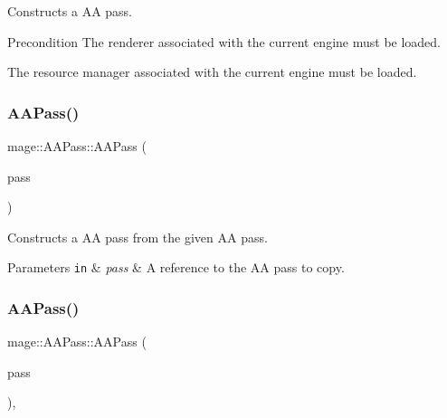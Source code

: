 Constructs a AA pass.

\begin{DoxyPrecond}{Precondition}
The renderer associated with the current engine must be loaded. 

The resource manager associated with the current engine must be loaded. 
\end{DoxyPrecond}
\hypertarget{classmage_1_1_a_a_pass_ad04c9e92bfb9f0318a56d980514f9a1a}{}\label{classmage_1_1_a_a_pass_ad04c9e92bfb9f0318a56d980514f9a1a} 
\subsubsection{\texorpdfstring{A\+A\+Pass()}{AAPass()}\hspace{0.1cm}{\footnotesize\ttfamily [2/3]}}
{\footnotesize\ttfamily mage\+::\+A\+A\+Pass\+::\+A\+A\+Pass (\begin{DoxyParamCaption}\item[{const \hyperlink{classmage_1_1_a_a_pass}{A\+A\+Pass} \&}]{pass }\end{DoxyParamCaption})\hspace{0.3cm}{\ttfamily [delete]}}

Constructs a AA pass from the given AA pass.


\begin{DoxyParams}[1]{Parameters}
\mbox{\tt in}  & {\em pass} & A reference to the AA pass to copy. \\
\hline
\end{DoxyParams}
\hypertarget{classmage_1_1_a_a_pass_a43a1a7fe8e5f02a67259b865edb2f34e}{}\label{classmage_1_1_a_a_pass_a43a1a7fe8e5f02a67259b865edb2f34e} 
\subsubsection{\texorpdfstring{A\+A\+Pass()}{AAPass()}\hspace{0.1cm}{\footnotesize\ttfamily [3/3]}}
{\footnotesize\ttfamily mage\+::\+A\+A\+Pass\+::\+A\+A\+Pass (\begin{DoxyParamCaption}\item[{\hyperlink{classmage_1_1_a_a_pass}{A\+A\+Pass} \&\&}]{pass }\end{DoxyParamCaption})\hspace{0.3cm}{\ttfamily [default]}, {\ttfamily [noexcept]}}


